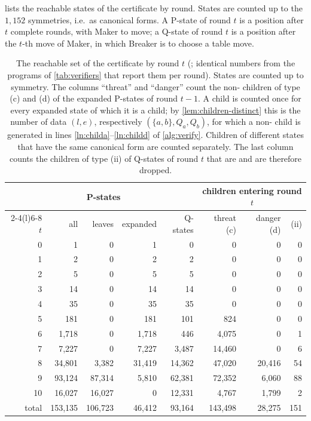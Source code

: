  lists the reachable states of the certificate by round. States are counted up to the
$1{,}152$ symmetries, i.e.\ as canonical forms. A P-state of round $t$ is a position after $t$ complete
rounds, with Maker to move; a Q-state of round $t$ is a position after the $t$-th move of Maker, in
which Breaker is to choose a table move.

\begin{table}[ht]
\centering\small
\begin{tabular}{@{}rrrrrrrr@{}}
\toprule
 & \multicolumn{3}{c}{P-states} & & \multicolumn{3}{c}{children entering round $t$}\\
\cmidrule(lr){2-4}\cmidrule(l){6-8}
$t$ & all & leaves & expanded & Q-states & threat (c) & danger (d) & \VOID{} (ii)\\
\midrule
 0 & 1 & 0 & 1 & 0 & 0 & 0 & 0\\
 1 & 2 & 0 & 2 & 2 & 0 & 0 & 0\\
 2 & 5 & 0 & 5 & 5 & 0 & 0 & 0\\
 3 & 14 & 0 & 14 & 14 & 0 & 0 & 0\\
 4 & 35 & 0 & 35 & 35 & 0 & 0 & 0\\
 5 & 181 & 0 & 181 & 101 & 824 & 0 & 0\\
 6 & 1{,}718 & 0 & 1{,}718 & 446 & 4{,}075 & 0 & 1\\
 7 & 7{,}227 & 0 & 7{,}227 & 3{,}487 & 14{,}460 & 0 & 6\\
 8 & 34{,}801 & 3{,}382 & 31{,}419 & 14{,}362 & 47{,}020 & 20{,}416 & 54\\
 9 & 93{,}124 & 87{,}314 & 5{,}810 & 62{,}381 & 72{,}352 & 6{,}060 & 88\\
10 & 16{,}027 & 16{,}027 & 0 & 12{,}331 & 4{,}767 & 1{,}799 & 2\\
\midrule
total & 153{,}135 & 106{,}723 & 46{,}412 & 93{,}164 & 143{,}498 & 28{,}275 & 151\\
\bottomrule
\end{tabular}
\caption{The reachable set of the certificate by round $t$ (; identical
numbers from the programs of \cref{tab:verifiers} that report them per round). States are counted up to
symmetry. The columns
``threat'' and ``danger'' count the non-\VOID{} children of type (c) and (d) of the
expanded P-states of round $t-1$. A child is counted once for every expanded state of which it is a
child; by \cref{lem:children-distinct} this is the number of data $(l,e)$, respectively
$(\{a,b\},Q_a,Q_b)$, for which a non-\VOID{} child is generated in lines
\ref{ln:childa}--\ref{ln:childd} of \cref{alg:verify}. Children of different states that have the same
canonical form are counted separately. The last column counts the children of type (ii) of
Q-states of round $t$ that are \VOID{} and are therefore dropped.}
\label{tab:tree}
\end{table}

